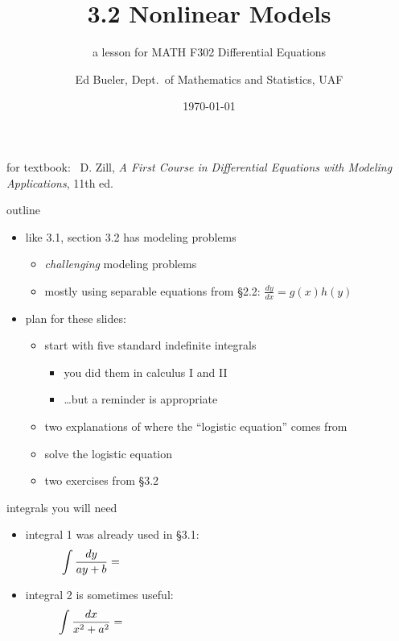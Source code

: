 \documentclass{beamer}
\title{3.2 Nonlinear Models}
\subtitle{a lesson for MATH F302 Differential Equations}
\author{Ed Bueler, Dept.~of Mathematics and Statistics, UAF}
\date{\tiny \today}
\begin{document}


\begin{frame}
\titlepage

\centerline{\tiny for textbook: \, D. Zill, \emph{A First Course in Differential Equations with Modeling Applications}, 11th ed.}
\end{frame}


\begin{frame}{outline}

\begin{itemize}
\item like 3.1, section 3.2 has modeling problems
    \begin{itemize}
    \item \emph{challenging} modeling problems
    \item mostly using separable equations from \S2.2: $\frac{dy}{dx} = g(x) h(y)$
    \end{itemize}
\item plan for these slides:
    \begin{itemize}
    \item start with five standard indefinite integrals
        \begin{itemize}
        \item you did them in calculus I and II
        \item \dots but a reminder is appropriate
        \end{itemize}
    \item two explanations of where the ``logistic equation'' comes from
    \item solve the logistic equation
    \item two exercises from \S3.2
    \end{itemize} 
\end{itemize}
\end{frame}


\begin{frame}{integrals you will need}

\begin{itemize}
\item {\color{blue} integral 1} was already used in \S3.1:
    $$\int \frac{dy}{ay+b} = \hspace{80mm}$$

\vspace{10mm}
\item {\color{blue} integral 2} is sometimes useful:
    $$\int \frac{dx}{x^2+a^2} = \hspace{80mm}$$

\vspace{25mm}
\end{itemize}
\end{frame}
\end{document}
